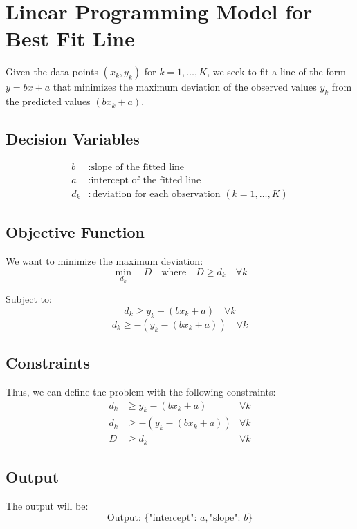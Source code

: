 \documentclass{article}
\begin{document}
\section*{Linear Programming Model for Best Fit Line}

Given the data points \((x_k, y_k)\) for \(k = 1, \ldots, K\), we seek to fit a line of the form \(y = bx + a\) that minimizes the maximum deviation of the observed values \(y_k\) from the predicted values \((bx_k + a)\).

\subsection*{Decision Variables}
\begin{align*}
b & : \text{slope of the fitted line} \\
a & : \text{intercept of the fitted line} \\
d_k & : \text{deviation for each observation } (k = 1, \ldots, K)
\end{align*}

\subsection*{Objective Function}
We want to minimize the maximum deviation:
\[
\min_{d_k} \quad D \quad \text{where} \quad D \geq d_k \quad \forall k
\]

Subject to:
\[
d_k \geq y_k - (bx_k + a) \quad \forall k
\]
\[
d_k \geq -(y_k - (bx_k + a)) \quad \forall k
\]

\subsection*{Constraints}
Thus, we can define the problem with the following constraints:
\begin{align*}
d_k & \geq y_k - (bx_k + a) & \forall k \\
d_k & \geq -(y_k - (bx_k + a)) & \forall k \\
D & \geq d_k & \forall k
\end{align*}

\subsection*{Output}
The output will be:
\[
\text{Output: } \{ \text{"intercept": } a, \text{"slope": } b \}
\]
\end{document}
